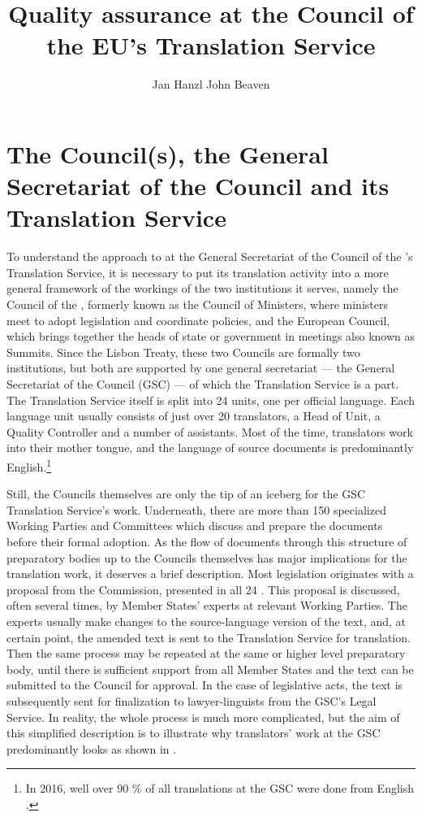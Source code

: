 \documentclass[output=paper]{langsci/langscibook}
\author{Jan Hanzl\lastand
John Beaven\affiliation{Council of the European Union$^*$}}
\title{Quality assurance at the Council of the EU’s Translation Service}
\begin{document}
\section{The Council(s), the General Secretariat of the Council and its Translation Service}\label{sec:hanzl:hanzl:1}

To understand the approach to  at the General Secretariat of the Council of the 's Translation Service, it is necessary to put its translation activity into a more general framework of the workings of the two institutions it serves, namely the Council of the , formerly known as the Council of Ministers, where ministers meet to adopt legislation and coordinate policies, and the European Council, which brings together the heads of state or government in meetings also known as  Summits.  Since the Lisbon Treaty, these two Councils are formally two  institutions, but both are supported by one general secretariat — the General Secretariat of the Council (GSC) — of which the Translation Service is a part. The Translation Service itself is split into 24 units, one per official language. Each language unit usually consists of just over 20 translators, a Head of Unit, a Quality Controller and a number of assistants. Most of the time, translators work into their mother tongue, and the language of source documents is predominantly English.\footnote{In 2016, well over 90 \% of all translations at the GSC were done from English \citep{Council2017}.}

Still, the Councils themselves are only the tip of an iceberg for the GSC Translation Service's work. Underneath, there are more than 150 specialized Working Parties and Committees which discuss and prepare the documents before their formal adoption. As the flow of documents through this structure of preparatory bodies up to the Councils themselves has major implications for the translation work, it deserves a brief description. Most  legislation originates with a proposal from the Commission, presented in all 24  . This proposal is discussed, often several times, by Member States' experts at relevant Working Parties. The experts usually make changes to the source-language version of the text, and, at certain point, the amended text is sent to the Translation Service for translation. Then the same process may be repeated at the same or higher level preparatory body, until there is sufficient support from all Member States and the text can be submitted to the Council for approval. In the case of legislative acts, the text is subsequently sent for finalization to lawyer-linguists from the GSC's Legal Service. In reality, the whole process is much more complicated, but the aim of this simplified description is to illustrate why translators' work at the GSC predominantly looks as shown in .
\end{document}

